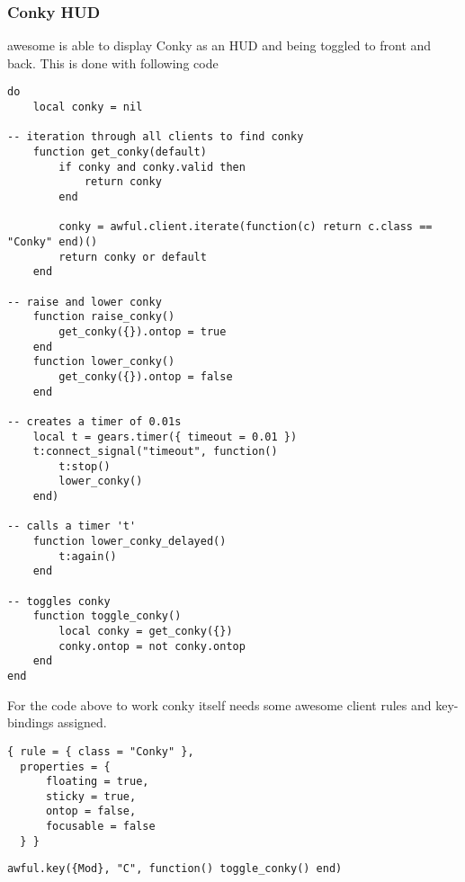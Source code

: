 			\subsubsection{Conky HUD}
				awesome is able to display Conky as an HUD and being toggled to front and back. This is done with following code
				\begin{lstlisting}
do
    local conky = nil

-- iteration through all clients to find conky
    function get_conky(default)
        if conky and conky.valid then
            return conky
        end

        conky = awful.client.iterate(function(c) return c.class == "Conky" end)()
        return conky or default
    end
    
-- raise and lower conky
    function raise_conky()
        get_conky({}).ontop = true
    end
    function lower_conky()
        get_conky({}).ontop = false
    end
    
-- creates a timer of 0.01s
    local t = gears.timer({ timeout = 0.01 })
    t:connect_signal("timeout", function()
        t:stop()
        lower_conky()
    end)
    
-- calls a timer 't'
    function lower_conky_delayed()
        t:again()
    end
    
-- toggles conky
    function toggle_conky()
        local conky = get_conky({})
        conky.ontop = not conky.ontop
    end
end
				\end{lstlisting}
				
				For the code above to work conky itself needs some awesome client rules and key-bindings  assigned.
				\begin{lstlisting}
{ rule = { class = "Conky" },
  properties = {
      floating = true,
      sticky = true,
      ontop = false,
      focusable = false
  } }
				\end{lstlisting}
				\begin{lstlisting}
awful.key({Mod}, "C", function() toggle_conky() end)
				\end{lstlisting}